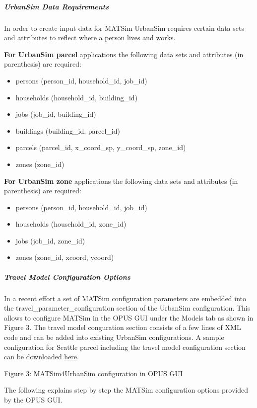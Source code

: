 \subparagraph{UrbanSim Data Requirements}

In order to create input data for MATSim UrbanSim requires certain  data sets and attributes to reflect where a person lives and works.

\textbf{For UrbanSim parcel} applications the following data sets and attributes (in parenthesis) are required:
\begin{itemize}
	\item persons (person\_id, household\_id, job\_id)
	\item households (household\_id, building\_id)
	\item jobs (job\_id, building\_id)
	\item buildings (building\_id, parcel\_id)
	\item parcels (parcel\_id, x\_coord\_sp, y\_coord\_sp, zone\_id)
	\item zones (zone\_id)
\end{itemize}

\textbf{For UrbanSim zone} applications the following data sets and attributes (in parenthesis) are required:
\begin{itemize}
	\item persons (person\_id, household\_id, job\_id)
	\item households (household\_id, zone\_id)
	\item jobs (job\_id, zone\_id)
	\item zones (zone\_id, xcoord, ycoord)
\end{itemize}

\subparagraph{Travel Model Configuration Options}

In a recent effort a set of MATSim configuration parameters are  embedded into the travel\_parameter\_configuration section of the UrbanSim  configuration. This allows to configure MATSim in the OPUS GUI under  the Models tab as shown in Figure 3. The travel model conguration  section consists of a few lines of XML code and can be added into  existing UrbanSim configurations. A sample configuration for Seattle  parcel including the travel model configuration section can be  downloaded \href{https://svn.vsp.tu-berlin.de/repos/public-svn/matsim/examples/countries/us/seattle/seattle_parcel.xml}{here}.



Figure 3: MATSim4UrbanSim configuration in OPUS GUI

The following explains step by step the MATSim configuration options provided by the OPUS GUI.

